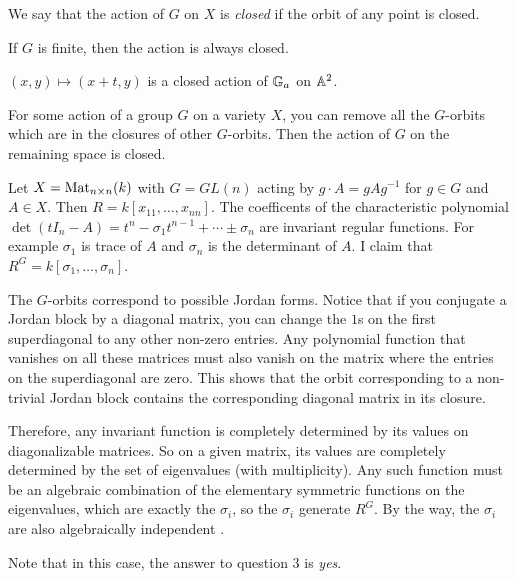 \begin{definition}
 We say that the action of $G$ on $X$ is \emph{closed} if the orbit of any point is closed.
\end{definition}
\begin{example}
 If $G$ is finite, then the action is always closed.
\end{example}
\begin{example}
 $(x,y)\mapsto (x+t,y)$ is a closed action of $\GG_a$ on $\AA^2$.
\end{example}
\begin{example}\label{lec1Eg:removebad}
 For some action of a group $G$ on a variety $X$, you can remove all the $G$-orbits which are in the closures of other $G$-orbits. Then the action of $G$ on the remaining space is closed.
\end{example}
\begin{example}\label{lec1Eg:conjugation}
 Let $X=\mat_{n\times n}(k)$ with $G=GL(n)$ acting by $g\cdot A=gAg^{-1}$ for $g\in G$ and $A\in X$. Then $R=k[x_{11},\dots, x_{nn}]$.  The coefficents of the characteristic polynomial $\det(tI_n-A)=t^n - \sigma_1 t^{n-1}+\cdots \pm \sigma_n$ are invariant regular functions. For example $\sigma_1$ is trace of $A$ and $\sigma_n$ is the determinant of $A$. I claim that $R^G=k[\sigma_1,\dots, \sigma_n]$.
  
 The $G$-orbits correspond to possible Jordan forms. Notice that if you conjugate a Jordan block by a diagonal matrix, you can change the $1$s on the first superdiagonal to any other non-zero entries. Any polynomial function that vanishes on all these matrices must also vanish on the matrix where the entries on the superdiagonal are zero. This shows that the orbit corresponding to a non-trivial Jordan block contains the corresponding diagonal matrix in its closure. 
 
 Therefore, any invariant function is completely determined by its values on diagonalizable matrices. So on a given matrix, its values are completely determined by the set of eigenvalues (with multiplicity). Any such function must be an algebraic combination of the elementary symmetric functions on the eigenvalues, which are exactly the $\sigma_i$, so the $\sigma_i$ generate $R^G$. By the way, the $\sigma_i$ are also algebraically independent \cite[Theorem 7.4.4]{stanley2}.
 
 Note that in this case, the answer to question 3 is \emph{yes}.
\end{example}


